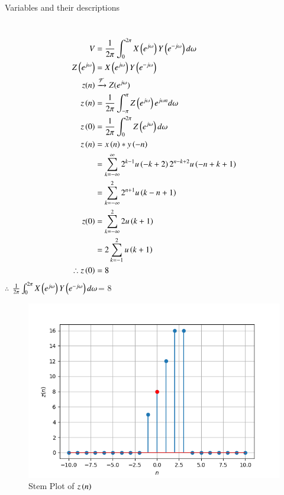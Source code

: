 \documentclass[journal,12pt,twocolumn]{IEEEtran}
\theoremstyle{remark}
\begin{document}
\solution\\
\begin{table}[h]
         \label{tab:table}
         
         \caption{Variables and their descriptions}
     \end{table}\\
\begin{align}
    V&=\frac{1}{2\pi}\int_{0}^{2\pi} X\left(e^{j\omega}\right) Y\left(e^{-j\omega}\right) d \omega\\
     Z\left(e^{j\omega}\right)&= X\left(e^{j\omega}\right) Y\left(e^{-j \omega}\right)\\
           z(n)&\xrightarrow{\mathcal{F}} Z(e^{j\omega})\\
           z\left(n\right)&=\frac{1}{2\pi}\int_{-\pi}^{\pi} Z\left(e^{j\omega}\right) e^{j\omega n} d\omega\\
      z\left(0\right)&=\frac{1}{2\pi}\int_{0}^{2\pi} Z\left(e^{j\omega}\right) d \omega\\
   z\left( n\right)&= x\left(n\right) * y\left(-n\right)\\
   &=\sum_{k=-\infty}^{\infty} 2^{k-1} u\left(-k+2\right) 2^{n-k+2} u\left(-n+k+1\right)\\
   &=\sum_{k=-\infty}^{2} 2^{n+1} u\left(k-n+1\right)\\
   z(0)&=\sum_{k=-\infty}^{2} 2 u\left(k+1\right)\\
   &=2\sum_{k=-1}^{2}u\left(k+1\right)\\
  \therefore z\left(0\right) &=8
\end{align}
$\therefore$ $\frac{1}{2\pi}\int_{0}^{2\pi} X\left(e^{j\omega}\right) Y\left(e^{-j\omega}\right) d \omega$= $8$
\renewcommand{\thefigure}{\theenumi}
 \renewcommand{\thetable}{\theenumi}
\begin{figure}[h]
  
  \includegraphics[width=\columnwidth]{figs/Figure_1.png}
  \caption{Stem Plot of $z\left(n\right)$}
\end{figure}
\end{document}
